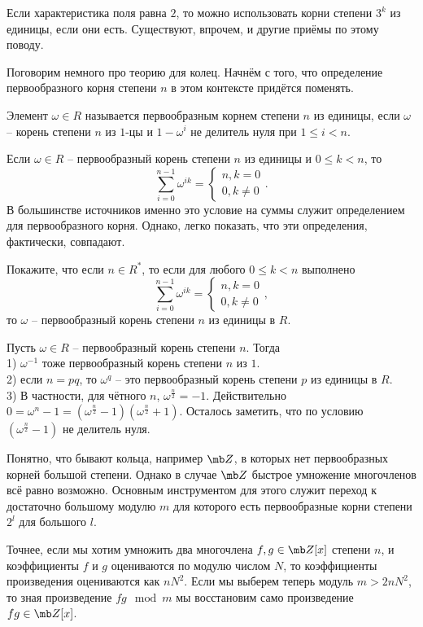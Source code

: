 Если характеристика поля равна $2$, то можно использовать корни степени $3^k$ из единицы, если они есть. Существуют, впрочем, и другие приёмы по этому поводу.


Поговорим немного про теорию для колец. Начнём с того, что определение первообразного корня степени $n$ в этом контексте придётся поменять.



\dfn Элемент  $\omega \in R$ называется первообразным корнем  степени $n$ из единицы, если $\omega$ -- корень степени $n$ из $1$-цы и $1-\omega^i$ не делитель нуля при $1\leq i< n$.
\edfn

\rm Если $\omega \in R$ -- первообразный корень степени $n$ из единицы  и $0\leq k < n$, то 
$$\sum_{i=0}^{n-1}\omega^{ik}=\begin{cases} n, k=0\\
0, k\neq 0
\end{cases}.$$
В большинстве источников именно это условие на суммы служит определением для первообразного корня. Однако, легко показать, что эти определения, фактически, совпадают.
\erm

\upr Покажите, что если $n \in R^*$, то если для любого  $0\leq k < n$ выполнено
$$\sum_{i=0}^{n-1}\omega^{ik}=\begin{cases} n, k=0\\
0, k\neq 0
\end{cases},$$
то $\omega$ -- первообразный корень степени $n$ из единицы в $R$.
\eupr

\rm Пусть $\omega \in R$ -- первообразный корень степени $n$. Тогда\\
1) $\omega^{-1}$ тоже первообразный корень степени $n$ из $1$.\\
2) если $n=pq$, то $\omega^q$ -- это первообразный корень степени $p$ из единицы в $R$.\\
3) В частности, для чётного $n$, $\omega^{\frac{n}{2}}=-1$. Действительно $0=\omega^n-1=(\omega^{\frac{n}{2}}-1)(\omega^{\frac{n}{2}}+1)$. Осталось заметить, что по условию $(\omega^{\frac{n}{2}}-1)$ не делитель нуля.
\erm

Понятно, что бывают кольца, например $\mb Z$, в которых нет первообразных корней большой степени. Однако в случае $\mb Z$ быстрое умножение многочленов всё равно возможно. Основным инструментом для этого служит переход к достаточно большому модулю $m$ для которого есть первообразные корни степени $2^l$ для большого $l$.

Точнее, если мы хотим умножить два многочлена $f,g\in \mb Z[x]$ степени $n$, и коэффициенты $f$ и $g$ оцениваются по модулю числом $N$, то коэффициенты произведения оцениваются как $nN^2$. Если мы выберем теперь модуль $m >2nN^2$, то зная произведение $fg \mod m$ мы восстановим само произведение $fg \in \mb Z[x]$. 

